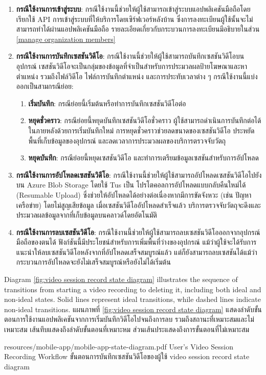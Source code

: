\else
\begin{enumerate}
    \item \textbf{กรณีใช้งานการเข้าสู่ระบบ}: กรณีใช้งานนี้ช่วยให้ผู้ใช้สามารถเข้าสู่ระบบแอปพลิเคชันมือถือโดยเรียกใช้ API การเข้าสู่ระบบที่ให้บริการโดยเซิร์ฟเวอร์หลังบ้าน ซึ่งการลงทะเบียนผู้ใช้นั้นจะไม่สามารถทำได้ผ่านแอปพลิเคชันมือถือ รายละเอียดเกี่ยวกับกระบวนการลงทะเบียนมีอธิบายในส่วน \ref{manage organization members}
    \item \textbf{กรณีใช้งานการบันทึกเซสชันวิดีโอ}: กรณีใช้งานนี้ช่วยให้ผู้ใช้สามารถบันทึกเซสชันวิดีโอบนอุปกรณ์ เซสชันวิดีโอจะเป็นกลุ่มของข้อมูลที่จำเป็นสำหรับการประมวลผลป้ายโฆษณาและหาตำแหน่ง รวมถึงไฟล์วิดีโอ  ไฟล์การบันทึกตำแหน่ง และการประทับเวลาต่าง ๆ กรณีใช้งานนี้แบ่งออกเป็นสามกรณีย่อย:
    \begin{enumerate}
        \item \textbf{เริ่มบันทึก}: กรณีย่อยนี้เริ่มต้นหรือทำการบันทึกเซสชันวิดีโอต่อ  
        \item \textbf{หยุดชั่วคราว}: กรณีย่อยนี้หยุดบันทึกเซสชันวิดีโอชั่วคราว ผู้ใช้สามารถดำเนินการบันทึกต่อได้ในภายหลังด้วยการเริ่มบันทึกใหม่ การหยุดชั่วคราวช่วยลดขนาดของเซสชันวิดีโอ ประหยัดพื้นที่เก็บข้อมูลของอุปกรณ์ และลดเวลาการประมวลผลของบริการตรวจจับวัตถุ  
        \item \textbf{หยุดบันทึก}: กรณีย่อยนี้หยุดเซสชันวิดีโอ และทำการเตรียมข้อมูลเซสชันสำหรับการอัปโหลด  
    \end{enumerate}
    \item \textbf{กรณีใช้งานการอัปโหลดเซสชันวิดีโอ}: กรณีใช้งานนี้ช่วยให้ผู้ใช้สามารถอัปโหลดเซสชันวิดีโอไปยังบน Azure Blob Storage โดยใช้ Tus เป็น โปรโตคอลการอัปโหลดแบบกลับคืนใหม่ได้ (Resumable Upload) ซึ่งช่วยให้อัปโหลดได้อย่างต่อเนื่องหากมีการขัดจังหวะ (เช่น ปัญหาเครือข่าย) โดยไม่สูญเสียข้อมูล เมื่อเซสชันวิดีโออัปโหลดสำเร็จแล้ว บริการตรวจจับวัตถุจะดึงและประมวลผลข้อมูลจากที่เก็บข้อมูลบนคลาวด์โดยอัตโนมัติ  
    \item \textbf{กรณีใช้งานการลบเซสชันวิดีโอ}: กรณีใช้งานนี้ช่วยให้ผู้ใช้สามารถลบเซสชันวิดีโอออกจากอุปกรณ์มือถือของตนได้ ฟังก์ชันนี้มีประโยชน์สำหรับการเพิ่มพื้นที่ว่างของอุปกรณ์ แม้ว่าผู้ใช้จะได้รับการแนะนำให้ลบเซสชันวิดีโอหลังจากที่อัปโหลดเสร็จสมบูรณ์แล้ว แต่ก็ยังสามารถลบเซสชันได้แม้ว่ากระบวนการอัปโหลดจะยังไม่เสร็จสมบูรณ์หรือยังไม่ได้เริ่มต้น
\end{enumerate}
\fi

\ifenglish
Diagram \autoref{fig:video session record state diagram} illustrates the sequence of transitions from starting a video recording to deleting it, including both ideal and non-ideal states. Solid lines represent ideal transitions, while dashed lines indicate non-ideal transitions.
\else
แผนภาพที่ \autoref{fig:video session record state diagram} แสดงลำดับขั้นตอนการใช้งานแอปพลิเคชันจากการเริ่มบันทึกวิดีโอไปจนถึงการลบ รวมถึงสถานะที่เหมาะสมและไม่เหมาะสม เส้นทึบแสดงถึงลำดับขั้นตอนที่เหมาะหม ส่วนเส้นประแสดงถึงการขั้นตอนที่ไม่เหมาะสม
\fi

\insertPDFfigure
{resources/mobile-app/mobile-app-state-diagram.pdf}
{\ifenglish User's Video Session Recording Workflow \else ขั้นตอนการบันทึกเซสชันวิดีโอของผู้ใช้ \fi}
{video session record state diagram}